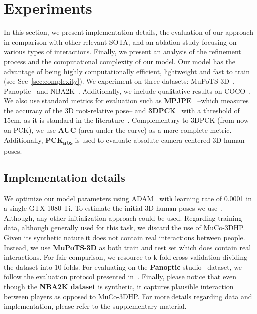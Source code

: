 \section{Experiments}\label{sec:experiments}

In this section, we present implementation details, the evaluation of our approach in comparison with other relevant SOTA, and an ablation study focusing on various types of interactions. Finally, we present an analysis of the refinement process and the computational complexity of our model. Our model has the advantage of being highly computationally efficient, lightweight and fast to train (see Sec~\ref{sec:complexity}). 
We experiment on three datasets: MuPoTS-3D~\cite{singleshot}, Panoptic~\cite{panoptic} and NBA2K~\cite{zhu_2020_eccv_nba}. Additionally, we include qualitative results on COCO~\cite{coco}. We also use standard metrics for evaluation such as \textbf{MPJPE}~\cite{ionescu_human3.6m:_2014} --which measures the accuracy of the 3D root-relative pose-- and \textbf{3DPCK}~\cite{mehta_monocular_2016} with a threshold of 15cm, as it is standard in the literature~\cite{guo2021pi,smap_eccv2020,hdnet_2020}. Complementary to 3DPCK (from now on PCK), we use \textbf{AUC} (area under the curve) as a more complete metric. Additionally, \textbf{PCK\textsubscript{abs}} is used to evaluate absolute camera-centered 3D human poses.  






\subsection{Implementation details}
\label{sec:implementation}
We optimize our model parameters using ADAM~\cite{adam} with learning rate of 0.0001 in a single GTX 1080 Ti. To estimate the initial 3D human poses we use~\cite{Moon_2019_ICCV_3DMPPE}. Although, any other initialization approach could be used. Regarding training data, although generally used for this task, we discard the use of MuCo-3DHP. Given its synthetic nature it does not contain real interactions between people. Instead, we use \textbf{MuPoTS-3D} as both train and test set which does contain real interactions. For fair comparison, we resource to k-fold cross-validation dividing the dataset into 10 folds. For evaluating on the \textbf{Panoptic} studio~\cite{panoptic} dataset, we follow the evaluation protocol presented in~\cite{zanfir_cvpr_2018_multiple,zanfir_multipeople_nips18}. Finally, please notice that even though the \textbf{NBA2K dataset} is synthetic, it captures plausible interaction between players as opposed to MuCo-3DHP. For more details regarding data and implementation, please refer to the supplementary material.

























